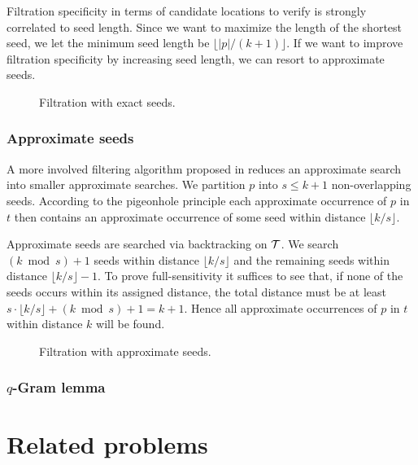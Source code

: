 Filtration specificity in terms of candidate locations to verify is strongly correlated to seed length.
Since we want to maximize the length of the shortest seed, we let the minimum seed length be $\lfloor |p|/(k+1) \rfloor$.
If we want to improve filtration specificity by increasing seed length, we can resort to approximate seeds.

\begin{figure}[h]
\caption{Filtration with exact seeds.}
\label{fig:seeds-ext}
\end{figure}

\subsubsection{Approximate seeds}
A more involved filtering algorithm proposed in \cite{Navarro2000} reduces an approximate search into smaller approximate searches.
We partition $p$ into $s \leq k+1$ non-overlapping seeds.
According to the pigeonhole principle each approximate occurrence of $p$ in $t$ then contains an approximate occurrence of some seed within distance $\lfloor k/s \rfloor$.

Approximate seeds are searched via backtracking on $\mathcal {T}$.
We search $(k \bmod{s}) + 1$ seeds within distance $\lfloor k/s \rfloor$ and the remaining seeds within distance $\lfloor k/s \rfloor - 1$.
To prove full-sensitivity it suffices to see that, if none of the seeds occurs within its assigned distance, the total distance must be at least $s \cdot \lfloor k/s \rfloor + (k \bmod s) + 1 = k + 1$.
Hence all approximate occurrences of $p$ in $t$ within distance $k$ will be found.

\begin{figure}[h]
\caption{Filtration with approximate seeds.}
\label{fig:seeds-apx}
\end{figure}

\subsubsection{$q$-Gram lemma}


\section{Related problems}


